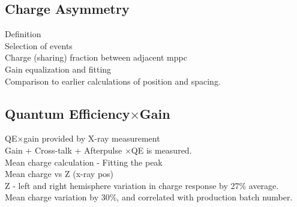 \subsection{Charge Asymmetry}
\noindent Definition \\
Selection of events \\
Charge (sharing) fraction between adjacent mppc \\
Gain equalization and fitting  \\
Comparison to earlier calculations of position and spacing. \\


\subsection{Quantum Efficiency$\times$Gain}
\noindent QE$\times$gain provided by X-ray measurement \\
Gain + Cross-talk + Afterpulse $\times$QE is measured. \\
Mean charge calculation - Fitting the peak \\
Mean charge vs Z (x-ray pos) \\
Z - left and right hemisphere variation in charge response by 27\% average. \\
Mean charge variation by 30\%, and correlated with production batch number. \\


